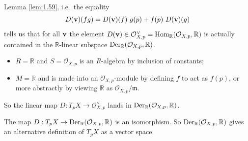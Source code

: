 \documentclass[a4paper,11pt]{article}
\begin{document}
	Lemma \ref{lem:1.59}, i.e.\ the equality
	\[
		D(\vb v) (fg) = D(\vb v)(f)\ g(p) + f(p)\ D(\vb v)(g)
	\]
	tells us that for all $\vb v$ the element $D(\vb v)\in \mathcal{O}_{X,p}^{\vee} = \operatorname{Hom}_{\mathbb{R}}(\mathcal{O}_{X,p},\mathbb{R})$ is actually contained in the $\mathbb{R}$-linear subspace $\operatorname{Der}_{\mathbb{R}}(\mathcal{O}_{X,p},\mathbb{R})$.
	
	\begin{itemize}
		\item $R = \mathbb{R}$ and $S = \mathcal{O}_{X,p}$ is an $R$-algebra by inclusion of constants;
		\item $M = \mathbb{R}$ and is made into an $\mathcal{O}_{X,p}$-module by defining $f$ to act as $f(p)$, or more abstractly by viewing $\mathbb{R}$ as $\mathcal{O}_{X,p}/\mathfrak{m}$.
	\end{itemize}

	So the linear map $D : T_p X \to \mathcal{O}_{X,p}^{\vee}$ lands in $\operatorname{Der}_{\mathbb{R}}(\mathcal{O}_{X,p},\mathbb{R})$.

	\begin{prop}
		The map $D : T_p X \to \operatorname{Der}_{\mathbb{R}}(\mathcal{O}_{X,p}, \mathbb{R})$ is an isomorphism. So $\operatorname{Der}_{\mathbb{R}}(\mathcal{O}_{X,p},\mathbb{R})$ gives an alternative definition of $T_p X$ as a vector space. 
	\end{prop}
\end{document}
